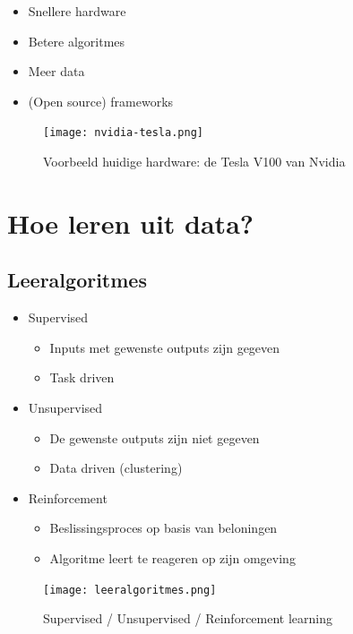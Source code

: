 \documentclass{article}
\begin{document}
\begin{itemize}
    \item Snellere hardware
    \item Betere algoritmes
    \item Meer data
    \item (Open source) frameworks
\end{itemize}

\begin{figure}[H]
    \centering
    \texttt{[image: nvidia-tesla.png]}
    \caption{Voorbeeld huidige hardware: de Tesla V100 van Nvidia}
\end{figure}

\section{Hoe leren uit data?}

\subsection{Leeralgoritmes}

\begin{itemize}
    \item Supervised
    \begin{itemize}
        \item Inputs met gewenste outputs zijn gegeven
        \item Task driven
    \end{itemize}
    \item Unsupervised
    \begin{itemize}
        \item De gewenste outputs zijn niet gegeven
        \item Data driven (clustering)
    \end{itemize}
    \item Reinforcement
    \begin{itemize}
        \item Beslissingsproces op basis van beloningen
        \item Algoritme leert te reageren op zijn omgeving
    \end{itemize}
\end{itemize}

\begin{figure}[H]
    \centering
    \texttt{[image: leeralgoritmes.png]}
    \caption{Supervised / Unsupervised / Reinforcement learning}
\end{figure}
\end{document}
